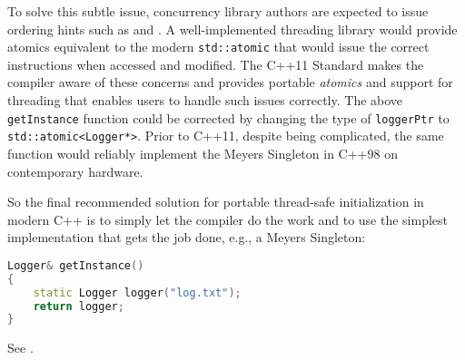 To solve this subtle issue, concurrency library authors are expected to
issue ordering hints such as  and . A
well-implemented threading library would provide atomics equivalent to
the modern \lstinline!std::atomic! that would issue the correct
instructions when accessed and modified. The C++11 Standard makes the
compiler aware of these concerns and provides portable \emph{atomics}
and support for threading that enables users to handle such issues
correctly. The above \lstinline!getInstance! function could be corrected by
changing the type of \lstinline!loggerPtr! to
\lstinline!std::atomic<Logger*>!. Prior to C++11, despite being
complicated, the same function would reliably implement the Meyers
Singleton in C++98 on contemporary hardware.

So the final recommended solution for portable thread-safe
initialization in modern C++ is to simply let the compiler do the work
and to use the simplest implementation that gets the job done, e.g., a
Meyers Singleton:

\begin{lstlisting}[language=C++]
Logger& getInstance()
{
    static Logger logger("log.txt");
    return logger;
}
\end{lstlisting}
    
\noindent See .

